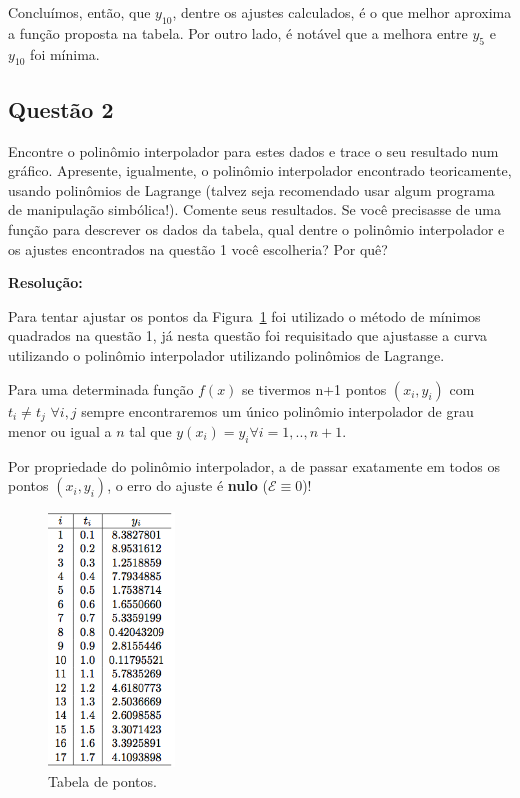\documentclass[12pt]{article}
\begin{document}
Concluímos, então, que $y_{10}$, dentre os ajustes calculados, é o que melhor aproxima a função proposta na tabela.
Por outro lado, é notável que a melhora entre $y_{5}$ e $y_{10}$ foi mínima.

\subsection{Questão 2}
\label{subsec:p1q2}

Encontre o polinômio interpolador para estes dados e trace o seu resultado num gráfico. Apresente, igualmente, o polinômio interpolador encontrado teoricamente, usando polinômios de Lagrange (talvez seja recomendado usar algum programa de manipulação simbólica!). Comente seus resultados. Se você precisasse de uma função para descrever os dados da tabela, qual dentre o polinômio interpolador e os ajustes encontrados na questão 1 você escolheria? Por quê?

\textbf{Resolução:}

Para tentar ajustar os pontos da Figura~\ref{fig:tab1} foi utilizado o método de mínimos quadrados na questão 1, já nesta questão foi requisitado que ajustasse a curva utilizando o polinômio interpolador utilizando polinômios de Lagrange.

Para uma determinada função $f(x)$ se tivermos n+1 pontos $(x_{i}, y_{i})$ com $t_{i} \neq t_{j}$ $\forall i,j$ sempre encontraremos um único polinômio interpolador de grau menor ou igual a $n$ tal que $y(x_{i}) = y_{i} \forall i=1,..,n+1$.

Por propriedade do polinômio interpolador, a de passar exatamente em todos os pontos $(x_{i}, y_{i})$, o erro do ajuste é \textbf{nulo} ($\mathcal{E}\equiv 0$)! 

\begin{figure}[H]
	\centering
	\includegraphics[width=0.3\textwidth]{tab1.png}
	\caption{Tabela de pontos.}
	\label{fig:tab1}
\end{figure}
\end{document}
